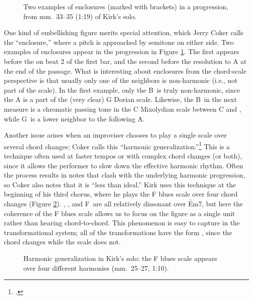 \begin{figure}[tbp]
  \caption[Two examples of enclosures in a \tfo progression.]{Two examples of
    enclosures (marked with brackets) in a \tfo progression, from mm.~33--35
    (1:19) of Kirk's solo.}
  \label{csa:enclosures}
\end{figure}

One kind of embellishing figure merits special attention, which Jerry Coker
calls the ``enclosure,'' where a pitch is approached by semitone on either
side. Two examples of enclosures appear in the \tfo progression in
Figure \ref{csa:enclosures}. The first appears before the \Bflat on beat 2 of
the first bar, and the second before the resolution to A at the end of the
passage. What is interesting about enclosures from the chord-scale perspective
is that usually only one of the neighbors is non-harmonic (i.e., not part of
the scale). In the first example, only the B\nat\ is truly non-harmonic, since
the A is a part of the (very clear) G Dorian scale. Likewise, the B\nat\ in
the next measure is a chromatic passing tone in the C Mixolydian scale between
C and \Bflat, while G\sharp\ is a lower neighbor to the following A.

Another issue arises when an improviser chooses to play a single scale over
several chord changes; Coker calls this ``harmonic
generalization.''\footcite[45--49]{coker:elements} This is a technique often
used at faster tempos or with complex chord changes (or both), since it allows
the performer to slow down the effective harmonic rhythm. Often the process
results in notes that clash with the underlying harmonic progression, so Coker
also notes that it is ``less than ideal.'' Kirk uses this technique
at the beginning of his third chorus, where he plays the F blues scale over
four chord changes (Figure \ref{csa:harmonic-generalization}).
\Bflat, \Aflat, and F\nat\ are all relatively dissonant over \h{Em7}, but here
the coherence of the F blues scale allows us to focus on the figure as a
single unit rather than hearing chord-to-chord. This phenomenon is easy to
capture in the transformational system; all of the transformations have the
form , since the chord changes while the scale does not.

\begin{figure}[tbp]
  \caption[Harmonic generalization in Kirk's solo.]{Harmonic generalization in
    Kirk's solo: the F blues scale appears over four different harmonies
    (mm.~25--27, 1:10).}
  \label{csa:harmonic-generalization}
\end{figure}

